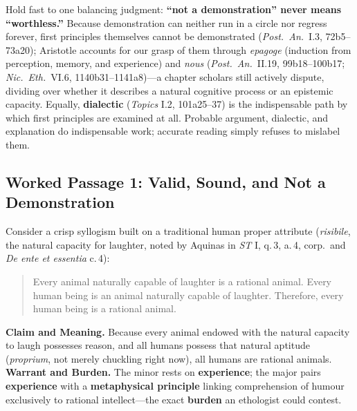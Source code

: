 Hold fast to one balancing judgment: \textbf{``not a demonstration'' never means ``worthless.''} Because demonstration can neither run in a circle nor regress forever, first principles themselves cannot be demonstrated (\emph{Post.\ An.}\ I.3, 72b5--73a20); Aristotle accounts for our grasp of them through \emph{epagoge} (induction from perception, memory, and experience) and \emph{nous} (\emph{Post.\ An.}\ II.19, 99b18--100b17; \emph{Nic.\ Eth.}\ VI.6, 1140b31--1141a8)---a chapter scholars still actively dispute, dividing over whether it describes a natural cognitive process or an epistemic capacity. Equally, \textbf{dialectic} (\emph{Topics} I.2, 101a25--37) is the indispensable path by which first principles are examined at all. Probable argument, dialectic, and explanation do indispensable work; accurate reading simply refuses to mislabel them.

\subsection{Worked Passage 1: Valid, Sound, and Not a Demonstration}

Consider a crisp syllogism built on a traditional human proper attribute (\emph{risibile}, the natural capacity for laughter, noted by Aquinas in \emph{ST} I, q.\,3, a.\,4, corp.\ and \emph{De ente et essentia} c.\,4):

\begin{quote}
Every animal naturally capable of laughter is a rational animal. Every human being is an animal naturally capable of laughter. Therefore, every human being is a rational animal.
\end{quote}

\textbf{Claim and Meaning.} Because every animal endowed with the natural capacity to laugh possesses reason, and all humans possess that natural aptitude (\emph{proprium}, not merely chuckling right now), all humans are rational animals. \textbf{Warrant and Burden.} The minor rests on \textbf{experience}; the major pairs \textbf{experience} with a \textbf{metaphysical principle} linking comprehension of humour exclusively to rational intellect---the exact \textbf{burden} an ethologist could contest.

